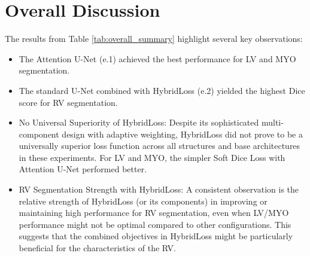 \documentclass{article}
\begin{document}
\section{Overall Discussion}
The results from Table \ref{tab:overall_summary} highlight several key observations:
\begin{itemize}
  \item The Attention U-Net (e.1) achieved the best performance for LV and MYO segmentation.
  \item The standard U-Net combined with HybridLoss (e.2) yielded the highest Dice score for RV segmentation.
  \item No Universal Superiority of HybridLoss: Despite its sophisticated multi-component design with adaptive weighting, HybridLoss did not prove to be a universally superior loss function across all structures and base architectures in these experiments. For LV and MYO, the simpler Soft Dice Loss with Attention U-Net performed better.
  \item RV Segmentation Strength with HybridLoss: A consistent observation is the relative strength of HybridLoss (or its components) in improving or maintaining high performance for RV segmentation, even when LV/MYO performance might not be optimal compared to other configurations. This suggests that the combined objectives in HybridLoss might be particularly beneficial for the characteristics of the RV.
\end{itemize}
\end{document}
